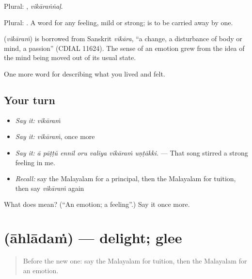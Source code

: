 Plural: , \emph{vikāraṅṅaḷ}.

Plural: . A word for any feeling, mild or strong;   is to be carried away by one.

\begin{cousinweb}
\textbf{} (\emph{vikāraṁ}) is borrowed from Sanskrit \emph{vikāra}, \textquotedblleft{}a change, a disturbance of body or mind, a passion\textquotedblright{} (CDIAL 11624). The sense of an emotion grew from the idea of the mind being moved out of its usual state.
\end{cousinweb}

\begin{grammarlens}[title={What you've built}]
One more word for describing what you lived and felt.
\end{grammarlens}

\subsection*{Your turn}
\begin{itemize}
\raggedright
  \item \emph{Say it:} \emph{vikāraṁ}
  \item \emph{Say it:} \emph{vikāraṁ}, once more
  \item \emph{Say it:} \emph{ā pāṭṭŭ ennil oru valiya vikāraṁ uṇṭākki.} — That song stirred a strong feeling in me.
  \item \emph{Recall:} say the Malayalam for a principal, then the Malayalam for tuition, then say \emph{vikāraṁ} again
\end{itemize}

\begin{tcolorbox}[breakable,colback=teal!4,colframe=teal!35!black,title={Before you move on}]
What does  mean? (\textquotedblleft{}An emotion; a feeling\textquotedblright{}.) Say it once more.
\end{tcolorbox}
\section[\texorpdfstring{\ml{ആഹ്ലാദം} (āhlādaṁ)}{ആഹ്ലാദം (āhlādaṁ)}]{ (āhlādaṁ) — delight; glee}

\label{lesson:ML-C517-ahladam}



\begin{quote}
Before the new one: say the Malayalam for tuition, then the Malayalam for an emotion.
\end{quote}

